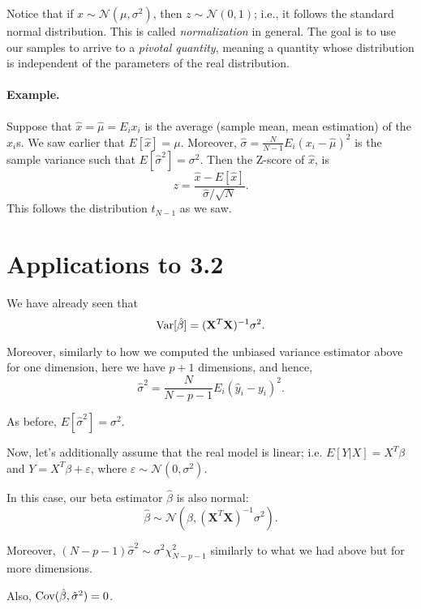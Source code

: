 \documentclass[11pt]{article}
\theoremstyle{definition}
\newcommand{\XX}{\mathbf{X}}
\newcommand{\Normal}[2]{\ensuremath{\mathcal N (#1, #2)}}
\begin{document}
Notice that if $x\sim\Normal{\mu}{\sigma^2}$, then $z\sim\Normal 0 1$; i.e., it
follows the standard normal distribution. This is called \emph{normalization} in
general. The goal is to use our samples to arrive to a \emph{pivotal quantity},
meaning a quantity whose distribution is independent of the parameters of the
real distribution.

\paragraph{Example.} Suppose that $\hat x=\hat\mu=E_i x_i$ is the average (sample mean,
mean estimation) of the $x_i$s. We saw earlier that $E[\hat{x}]=\mu$. Moreover,
$\hat\sigma=\frac{N}{N-1}E_i(x_i-\hat\mu)^2$ is the sample variance such that
$E[\hat\sigma^2]=\sigma^2$. Then the Z-score of $\hat x$, is 
\[z=\frac{\hat x-E[\hat x]}{\hat\sigma/\sqrt{N}}.\]
This follows the distribution $t_{N-1}$ as we saw.

\section{Applications to 3.2}
We have already seen that
\[\Var[\hat\beta]=(\XX^T\XX)^{-1}\sigma^2.\]

Moreover, similarly to how we computed the unbiased variance estimator above for
one dimension, here we have $p+1$ dimensions, and hence,
\[\hat\sigma^2=\frac{N}{N-p-1}E_i(\hat y_i-y_i)^2.\]

As before, $E[\hat\sigma^2]=\sigma^2$.

Now, let's additionally assume that the real model is linear; i.e.
$E[Y|X]=X^T\beta$ and $Y=X^T\beta+\varepsilon$, where
$\varepsilon\sim\Normal{0}{\sigma^2}$. 

In this case, our beta estimator $\hat\beta$ is also normal:
\[\hat\beta\sim\Normal{\beta}{(\XX^T\XX)^{-1}\sigma^2}.\]

Moreover, $(N-p-1)\hat\sigma^2\sim\sigma^2\chi^2_{N-p-1}$ similarly to what we 
had above but for more dimensions.

Also, $\operatorname*{Cov}(\hat\beta,\hat\sigma^2)=0$.
 
\end{document}
